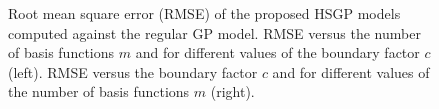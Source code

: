 \documentclass[onecolumn,a4paper,11pt]{article}
\begin{document}
\begin{figure}
\centering
{}
\caption{Root mean square error (RMSE) of the proposed HSGP models computed against the regular GP model. RMSE versus the number of basis functions $m$ and for different values of the boundary factor $c$ (left). RMSE versus the boundary factor $c$ and for different values of the number of basis functions $m$ (right). }
  \label{fig4_MSE_vs_J}
\end{figure}
\end{document}
